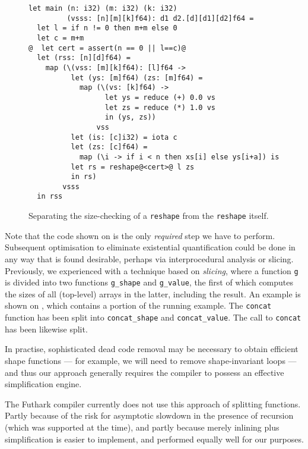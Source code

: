 \begin{figure}
\begin{lstlisting}
let main (n: i32) (m: i32) (k: i32)
         (vsss: [n][m][k]f64): d1 d2.[d][d1][d2]f64 =
  let l = if n != 0 then m+m else 0
  let c = m+m
@  let cert = assert(n == 0 || l==c)@
  let (rss: [n][d]f64) =
    map (\(vss: [m][k]f64): [l]f64 ->
          let (ys: [m]f64) (zs: [m]f64) =
            map (\(vs: [k]f64) ->
                  let ys = reduce (+) 0.0 vs
                  let zs = reduce (*) 1.0 vs
                  in (ys, zs))
                vss
          let (is: [c]i32) = iota c
          let (zs: [c]f64) =
            map (\i -> if i < n then xs[i] else ys[i+a]) is
          let rs = reshape@<cert>@ l zs
          in rs)
        vsss
  in rss
\end{lstlisting}

  \caption{Separating the size-checking of a \lstinline{reshape} from
    the \lstinline{reshape} itself.}
\label{fig:SimplifyFShapeCert}
\end{figure}

Note that the code shown on  is the only
\textit{required} step we have to perform.  Subsequent optimisation to
eliminate existential quantification could be done in any way that is
found desirable, perhaps via interprocedural analysis or slicing.
Previously, we experienced with a technique based on \textit{slicing},
where a function \lstinline{g} is divided into two functions
\lstinline{g_shape} and \lstinline{g_value}, the first of which
computes the sizes of all (top-level) arrays in the latter, including
the result.  An example is shown on ,
which contains a portion of the running example.  The
\lstinline{concat} function has been split into
\lstinline{concat_shape} and \lstinline{concat_value}. The call to
\lstinline{concat} has been likewise split.

In practise, sophisticated dead code removal may be necessary to
obtain efficient shape functions --- for example, we will need to
remove shape-invariant loops --- and thus our approach generally
requires the compiler to possess an effective simplification engine.

The Futhark compiler currently does not use this approach of splitting
functions.  Partly because of the risk for asymptotic slowdown in the
presence of recursion (which was supported at the time), and partly
because merely inlining plus simplification is easier to implement,
and performed equally well for our purposes.

